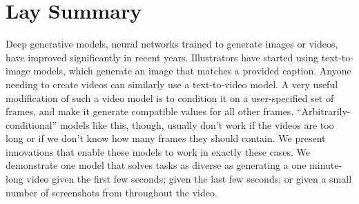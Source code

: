 

\chapter{Lay Summary}

Deep generative models, neural networks trained to generate images or videos, have improved significantly in recent years. Illustrators have started using text-to-image models, which generate an image that matches a provided caption. Anyone needing to create videos can similarly use a text-to-video model. A very useful modification of such a video model is to condition it on a user-specified set of frames, and make it generate compatible values for all other frames. ``Arbitrarily-conditional'' models like this, though, usually don't work if the videos are too long or if we don't know how many frames they should contain. We present innovations that enable these models to work in exactly these cases. We demonstrate one model that solves tasks as diverse as generating a one minute-long video given the first few seconds; given the last few seconds; or given a small number of screenshots from throughout the video.




\endinput

